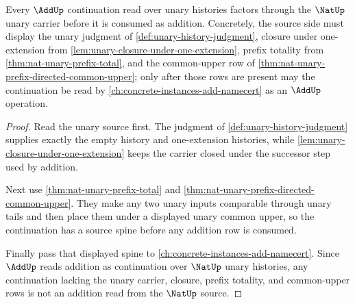 \begin{theorem}
\label{thm:nat-add-source-spine-forward-link}
Every $\AddUp$ continuation read over unary histories factors through the $\NatUp$ unary carrier before it is consumed as addition. Concretely, the source side must display the unary judgment of \autoref{def:unary-history-judgment}, closure under one-extension from \autoref{lem:unary-closure-under-one-extension}, prefix totality from \autoref{thm:nat-unary-prefix-total}, and the common-upper row of \autoref{thm:nat-unary-prefix-directed-common-upper}; only after those rows are present may the continuation be read by \autoref{ch:concrete-instances-add-namecert} as an $\AddUp$ operation.
\end{theorem}
\begin{proof}
Read the unary source first. The judgment of \autoref{def:unary-history-judgment} supplies exactly the empty history and one-extension histories, while \autoref{lem:unary-closure-under-one-extension} keeps the carrier closed under the successor step used by addition.

Next use \autoref{thm:nat-unary-prefix-total} and \autoref{thm:nat-unary-prefix-directed-common-upper}. They make any two unary inputs comparable through unary tails and then place them under a displayed unary common upper, so the continuation has a source spine before any addition row is consumed.

Finally pass that displayed spine to \autoref{ch:concrete-instances-add-namecert}. Since $\AddUp$ reads addition as continuation over $\NatUp$ unary histories, any continuation lacking the unary carrier, closure, prefix totality, and common-upper rows is not an addition read from the $\NatUp$ source.
\end{proof}

